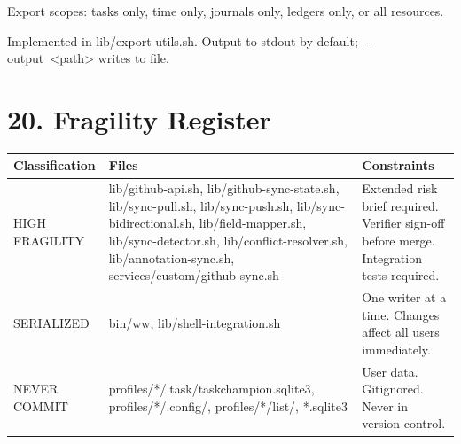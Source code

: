 \documentclass[11pt, a4paper, DIV=14]{scrartcl}
\renewcommand{\texttt}[1]{{\ttfamily\fontsize{8.5}{10.5}\selectfont\color{BabbNavy}#1}}
\let\origRule\rule
\renewcommand{\rule}[2]{\par\vspace{2pt}\noindent{\color{BabbBorder}\origRule[0pt]{#1}{#2}}\par\vspace{2pt}}
\begin{document}
Export scopes: tasks only, time only, journals only, ledgers only, or
all resources.

Implemented in \texttt{lib/export-utils.sh}. Output to stdout by
default; \texttt{-\/-output\ \textless{}path\textgreater{}} writes to
file.

\begin{center}\rule{0.5\linewidth}{0.5pt}\end{center}

\section{20. Fragility Register}\label{fragility-register}

{\def\LTcaptype{none} %
\begin{longtable}[]{@{}
  >{\raggedright\arraybackslash}p{}
  >{\raggedright\arraybackslash}p{}
  >{\raggedright\arraybackslash}p{}@{}}
\toprule\noalign{}
\begin{minipage}[b]{\linewidth}\raggedright
Classification
\end{minipage} & \begin{minipage}[b]{\linewidth}\raggedright
Files
\end{minipage} & \begin{minipage}[b]{\linewidth}\raggedright
Constraints
\end{minipage} \\
\midrule\noalign{}
\endhead
\bottomrule\noalign{}
\endlastfoot
HIGH FRAGILITY & \texttt{lib/github-api.sh},
\texttt{lib/github-sync-state.sh}, \texttt{lib/sync-pull.sh},
\texttt{lib/sync-push.sh}, \texttt{lib/sync-bidirectional.sh},
\texttt{lib/field-mapper.sh}, \texttt{lib/sync-detector.sh},
\texttt{lib/conflict-resolver.sh}, \texttt{lib/annotation-sync.sh},
\texttt{services/custom/github-sync.sh} & Extended risk brief required.
Verifier sign-off before merge. Integration tests required. \\
SERIALIZED & \texttt{bin/ww}, \texttt{lib/shell-integration.sh} & One
writer at a time. Changes affect all users immediately. \\
NEVER COMMIT & \texttt{profiles/*/.task/taskchampion.sqlite3},
\texttt{profiles/*/.config/}, \texttt{profiles/*/list/},
\texttt{*.sqlite3} & User data. Gitignored. Never in version control. \\
\end{longtable}
}
\end{document}
